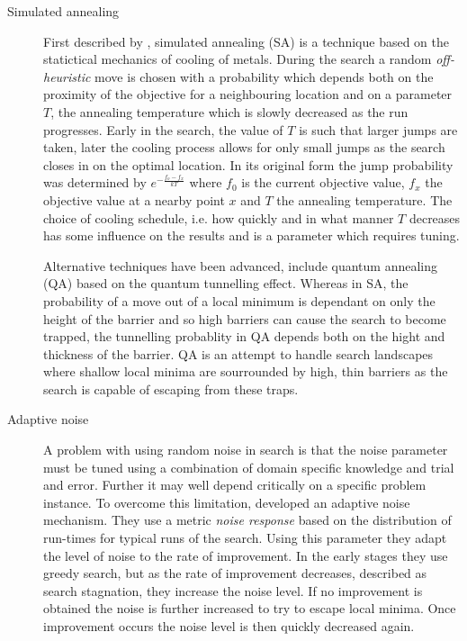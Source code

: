 \begin{description}
\item[Simulated annealing]
First described by \citet{kirkpatrick83optimization}, simulated annealing (SA) is a technique based on the statictical mechanics of cooling of metals. During the search a random \emph{off-heuristic} move is chosen with a probability which depends both on the proximity of the objective for a neighbouring location and on a parameter $T$, the annealing temperature which is slowly decreased as the run progresses. Early in the search, the value of $T$ is such that larger jumps are taken, later the cooling process allows for only small jumps as the search closes in on the optimal location. In its original form the jump probability was determined by $e^{-\frac{f_o-f_x}{kT}}$ where $f_0$ is the current objective value, $f_x$ the objective value at a nearby point $x$ and $T$ the annealing temperature. The choice of cooling schedule, i.e. how quickly and in what manner $T$ decreases has some influence on the results and is a parameter which requires tuning.

 Alternative techniques have been advanced, include quantum annealing (QA) \citep{apolloni89quantum} based on the quantum tunnelling effect. Whereas in SA, the probability of a move out of a local minimum is dependant on only the height of the barrier and so high barriers can cause the search to become trapped, the tunnelling probablity in QA depends both on the hight and thickness of the barrier. QA is an attempt to handle search landscapes where shallow local minima are sourrounded by high, thin barriers as the search is capable of escaping from these traps.


\item[Adaptive noise]
A problem with using random noise in search is that the noise parameter must be tuned using a combination of domain specific knowledge and trial and error. Further it may well depend critically on a specific problem instance. To overcome this limitation, \citet{hoos02adaptive} developed an adaptive noise mechanism. They use a metric \emph{noise response} based on the distribution of run-times for typical runs of the search. Using this parameter they adapt the level of noise to the rate of improvement. In the early stages they use greedy search, but as the rate of improvement decreases, described as search stagnation, they increase the noise level. If no improvement is obtained the noise is further increased to try to escape local minima. Once improvement occurs the noise level is then quickly decreased again.


\end{description}
